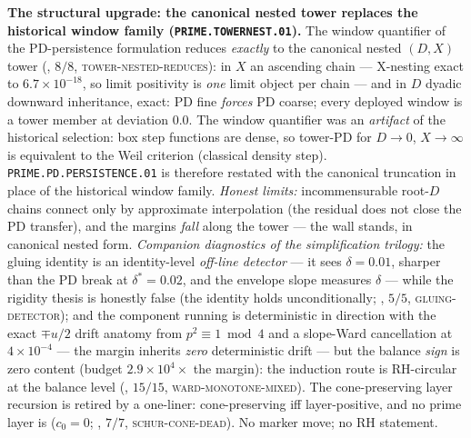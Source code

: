 \documentclass[11pt,a4paper]{article}
\begin{document}
\par\smallskip\noindent\textbf{The structural upgrade: the canonical
nested tower replaces the historical window family
(\texttt{PRIME.TOWERNEST.01}).}
The window quantifier of the PD-persistence formulation reduces
\emph{exactly} to the canonical nested $(D,X)$ tower
(, $8/8$,
\textsc{tower-nested-reduces}): in $X$ an ascending chain ---
X-nesting exact to $6.7\times10^{-18}$, so limit positivity is
\emph{one} limit object per chain --- and in $D$ dyadic downward
inheritance, exact: PD fine \emph{forces} PD coarse; every deployed
window is a tower member at deviation $0.0$.  The window quantifier
was an \emph{artifact} of the historical selection: box step
functions are dense, so tower-PD for $D\to0$, $X\to\infty$ is
equivalent to the Weil criterion (classical density step).
\texttt{PRIME.PD.PERSISTENCE.01} is therefore restated with the
canonical truncation in place of the historical window family.
\emph{Honest limits:} incommensurable root-$D$ chains connect only
by approximate interpolation (the residual does not close the PD
transfer), and the margins \emph{fall} along the tower --- the wall
stands, in canonical nested form.  \emph{Companion diagnostics of
the simplification trilogy:} the gluing identity is an
identity-level \emph{off-line detector} --- it sees $\delta=0.01$,
sharper than the PD break at $\delta^*=0.02$, and the envelope slope
measures $\delta$ --- while the rigidity thesis is honestly false
(the identity holds unconditionally;
, $5/5$, \textsc{gluing-detector});
and the component running is deterministic in direction with the
exact $\mp u/2$ drift anatomy from $p^2\equiv1\bmod4$ and a
slope-Ward cancellation at $4\times10^{-4}$ --- the margin inherits
\emph{zero} deterministic drift --- but the balance \emph{sign} is
zero content (budget $2.9\times10^4\times$ the margin): the
induction route is RH-circular at the balance level
(, $15/15$,
\textsc{ward-monotone-mixed}).  The cone-preserving layer recursion
is retired by a one-liner: cone-preserving iff layer-positive, and
no prime layer is ($c_0=0$;
, $7/7$,
\textsc{schur-cone-dead}).  No marker move; no RH statement.
\end{document}

